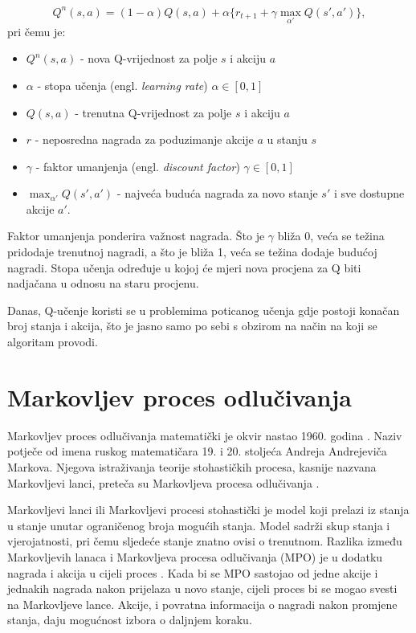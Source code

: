 \documentclass[]{foi} %
\begin{document}
\[ Q^n(s, a) = (1 - \alpha) Q(s, a) + \alpha \{r_{t+1} + \gamma \max_{\alpha '} Q(s' , a')\}, \]
pri čemu je:
\begin{itemize}
    \item $Q^n(s, a)$ - nova Q-vrijednost za polje $s$ i akciju $a$
    \item $\alpha$ - stopa učenja (engl. \textit{learning rate}) $\alpha \in [0, 1]$
    \item $Q(s, a)$ - trenutna Q-vrijednost za polje $s$ i akciju $a$
    \item $r$ - neposredna nagrada za poduzimanje akcije $a$ u stanju $s$
    \item $\gamma$ - faktor umanjenja (engl. \textit{discount factor}) $\gamma \in [0, 1]$
    \item $\max_{\alpha '} Q(s' , a')$ - najveća buduća nagrada za novo stanje $s'$ i sve dostupne akcije $a'$.
\end{itemize}
Faktor umanjenja ponderira važnost nagrada. Što je $\gamma$ bliža 0, veća se težina pridodaje trenutnoj nagradi, a što je bliža 1, veća se težina dodaje budućoj nagradi. Stopa učenja određuje u kojoj će mjeri nova procjena za Q biti nadjačana u odnosu na staru procjenu. \cite[str. 75]{AIandGames}

Danas, Q-učenje koristi se u problemima poticanog učenja gdje postoji konačan broj stanja i akcija, što je jasno samo po sebi s obzirom na način na koji se algoritam provodi.

\section{Markovljev proces odlučivanja}
Markovljev proces odlučivanja matematički je okvir nastao 1960. godina \cite[str. 1]{MDP}. Naziv potječe od imena ruskog matematičara 19. i 20. stoljeća Andreja Andrejeviča Markova. Njegova istraživanja teorije stohastičkih procesa, kasnije nazvana Markovljevi lanci, preteča su Markovljeva procesa odlučivanja \cite{markov}.

Markovljevi lanci ili Markovljevi procesi stohastički je model koji prelazi iz stanja u stanje unutar ograničenog broja mogućih stanja. Model sadrži skup stanja i vjerojatnosti, pri čemu sljedeće stanje znatno ovisi o trenutnom. Razlika između Markovljevih lanaca i Markovljeva procesa odlučivanja (MPO) je u dodatku nagrada i akcija u cijeli proces \cite[str. 482]{marinescu2017cloud}. Kada bi se MPO sastojao od jedne akcije i jednakih nagrada nakon prijelaza u novo stanje, cijeli proces bi se mogao svesti na Markovljeve lance. Akcije, i povratna informacija o nagradi nakon promjene stanja, daju mogućnost izbora o daljnjem koraku.
\end{document}
